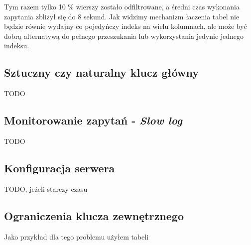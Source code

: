 Tym razem tylko 10 \% wierszy zostało odfiltrowane, a średni czas wykonania zapytania zbliżył się do 8 sekund. Jak widzimy mechanizm łaczenia tabel nie będzie równie wydajny co pojedyńczy indeks na wielu kolumnach, ale może być dobrą alternatywą do pełnego przeszukania lub wykorzystania jedynie jednego indeksu.
\subsection{Sztuczny czy naturalny klucz główny}
TODO

\subsection{Monitorowanie zapytań - \textit{Slow log}}
TODO

\subsection{Konfiguracja serwera}
TODO, jeżeli starczy czasu

\subsection{Ograniczenia klucza zewnętrznego}
Jako przykład dla tego problemu użyłem tabeli 

